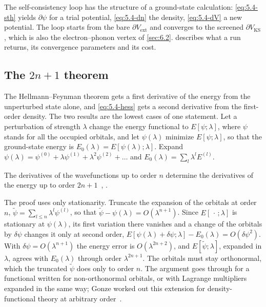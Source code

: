 The self-consistency loop has the structure of a ground-state calculation: \cref{eq:5.4-sth} yields $\partial\psi$ for a trial potential, \cref{eq:5.4-dn} the density, \cref{eq:5.4-dV} a new potential. The loop starts from the bare $\partial V_{\mathrm{ext}}$ and converges to the screened $\partial V_{\mathrm{KS}}$, which is also the electron--phonon vertex of \cref{sec:6.2}.  describes what a run returns, its convergence parameters and its cost.

\subsection{The \texorpdfstring{$2n+1$}{2n+1} theorem}

The Hellmann--Feynman theorem gets a first derivative of the energy from the unperturbed state alone, and \cref{eq:5.4-hess} gets a second derivative from the first-order density. The two results are the lowest cases of one statement. Let a perturbation of strength $\lambda$ change the energy functional to $E[\psi;\lambda]$, where $\psi$ stands for all the occupied orbitals, and let $\psi(\lambda)$ minimize $E[\psi;\lambda]$, so that the ground-state energy is $E_0(\lambda) = E[\psi(\lambda);\lambda]$. Expand $\psi(\lambda) = \psi^{(0)} + \lambda\psi^{(1)} + \lambda^2\psi^{(2)} + \dots$ and $E_0(\lambda) = \sum_l\lambda^lE^{(l)}$.
\begin{keyresult}[$2n+1$ theorem]
The derivatives of the wavefunctions up to order $n$ determine the derivatives of the energy up to order $2n+1$~\cite{gonze1995perturbation,gonze1995adiabatic}, \cite[Sect.~II.F.1]{baroni2001phonons}.
\end{keyresult}
The proof uses only stationarity. Truncate the expansion of the orbitals at order $n$, $\tilde\psi = \sum_{l\le n}\lambda^l\psi^{(l)}$, so that $\tilde\psi - \psi(\lambda) = O(\lambda^{n+1})$. Since $E[\,\cdot\,;\lambda]$ is stationary at $\psi(\lambda)$, its first variation there vanishes and a change of the orbitals by $\delta\psi$ changes it only at second order, $E[\psi(\lambda) + \delta\psi;\lambda] - E_0(\lambda) = O(\delta\psi^2)$. With $\delta\psi = O(\lambda^{n+1})$ the energy error is $O(\lambda^{2n+2})$, and $E[\tilde\psi;\lambda]$, expanded in $\lambda$, agrees with $E_0(\lambda)$ through order $\lambda^{2n+1}$. The orbitals must stay orthonormal, which the truncated $\tilde\psi$ does only to order $n$. The argument goes through for a functional written for non-orthonormal orbitals, or with Lagrange multipliers expanded in the same way; Gonze worked out this extension for density-functional theory at arbitrary order~\cite{gonze1995perturbation}.

